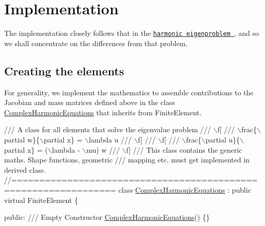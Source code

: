  

\hypertarget{index_impl}{}\section{Implementation}\label{index_impl}
The implementation closely follows that in the \href{../../harmonic/html/index.html}{\tt harmonic eigenproblem }, and so we shall concentrate on the differences from that problem.\hypertarget{index_equations}{}\subsection{Creating the elements}\label{index_equations}
For generality, we implement the mathematics to assemble contributions to the Jacobian and mass matrices defined above in the class {\ttfamily \hyperlink{classComplexHarmonicEquations}{Complex\+Harmonic\+Equations}} that inherits from {\ttfamily Finite\+Element}.

 
\begin{DoxyCodeInclude}
\textcolor{comment}{/// A class for all elements that solve the eigenvalue problem}
\textcolor{comment}{/// \(\backslash\)f[ }
\textcolor{comment}{}\textcolor{comment}{/// \(\backslash\)frac\{\(\backslash\)partial w\}\{\(\backslash\)partial x\}  = \(\backslash\)lambda u}
\textcolor{comment}{}\textcolor{comment}{/// \(\backslash\)f] }
\textcolor{comment}{}\textcolor{comment}{/// \(\backslash\)f[}
\textcolor{comment}{}\textcolor{comment}{/// \(\backslash\)frac\{\(\backslash\)partial u\}\{\(\backslash\)partial x\} = (\(\backslash\)lambda - \(\backslash\)mu) w}
\textcolor{comment}{}\textcolor{comment}{/// \(\backslash\)f]}
\textcolor{comment}{}\textcolor{comment}{/// This class  contains the generic maths. Shape functions, geometric}
\textcolor{comment}{}\textcolor{comment}{/// mapping etc. must get implemented in derived class.}
\textcolor{comment}{}\textcolor{comment}{//================================================================}
\textcolor{keyword}{class }\hyperlink{classComplexHarmonicEquations}{ComplexHarmonicEquations} : \textcolor{keyword}{public} \textcolor{keyword}{virtual} FiniteElement
\{

\textcolor{keyword}{public}:\textcolor{comment}{}
\textcolor{comment}{ /// Empty Constructor}
\textcolor{comment}{} \hyperlink{classComplexHarmonicEquations_aa93feb265f731b0d82c3c1c4c29f183d}{ComplexHarmonicEquations}() \{\}

\end{DoxyCodeInclude}


